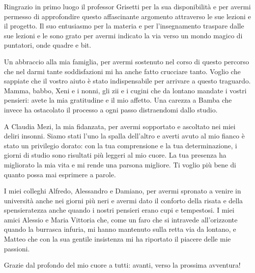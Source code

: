 \documentclass[noexaminfo,oneside]{sapthesis}
\begin{document}
\begin{acknowledgments}
Ringrazio in primo luogo il professor Grisetti per la sua disponibilità e per avermi permesso di approfondire questo affascinante argomento attraverso le sue lezioni e il progetto. Il suo entusiasmo per la materia e per l'insegnamento traspare dalle sue lezioni e le sono grato per avermi indicato la via verso un mondo magico di puntatori, onde quadre e bit.

Un abbraccio alla mia famiglia, per avermi sostenuto nel corso di questo percorso che nel darmi tante soddisfazioni mi ha anche fatto crucciare tanto. Voglio che sappiate che il vostro aiuto è stato indispensabile per arrivare a questo traguardo. Mamma, babbo, Xeni e i nonni, gli zii e i cugini che da lontano mandate i vostri pensieri: avete la mia gratitudine e il mio affetto. Una carezza a Bamba che invece ha ostacolato il processo a ogni passo distraendomi dallo studio. 

A Claudia Mezi, la mia fidanzata, per avermi sopportato e ascoltato nei miei deliri insonni. Siamo stati l'uno la spalla dell'altro e averti avuto al mio fianco è stato un privilegio dorato: con la tua comprensione e la tua determinazione, i giorni di studio sono risultati più leggeri al mio cuore. La tua presenza ha migliorato la mia vita e mi rende una parsona migliore. Ti voglio più bene di quanto possa mai esprimere a parole.

I miei colleghi Alfredo, Alessandro e Damiano, per avermi spronato a venire in università anche nei giorni più neri e avermi dato il conforto della risata e della spensieratezza anche quando i nostri pensieri erano cupi e tempestosi. I miei amici Alessio e Maria Vittoria che, come un faro che si intravede all'orizzonte quando la burrasca infuria, mi hanno mantenuto sulla retta via da lontano, e Matteo che con la sua gentile insistenza mi ha riportato il piacere delle mie passioni. 

Grazie dal profondo del mio cuore a tutti: avanti, verso la prossima avventura!
\end{acknowledgments}
\end{document}
